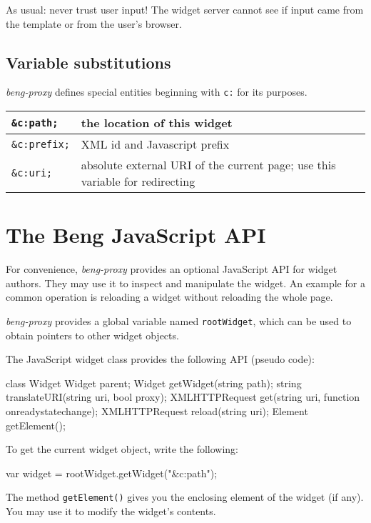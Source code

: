 \documentclass[a4paper,12pt]{article}
\begin{document}
As usual: never trust user input!  The widget server cannot see if
input came from the template or from the user's browser.

\subsection{Variable substitutions}

\emph{beng-proxy} defines special entities beginning with \texttt{c:}
for its purposes.

\begin{tabular}{|l|p{8cm}|}
\hline
\texttt{\&c:path;} & the location of this widget \\
\hline
\texttt{\&c:prefix;} & XML id and Javascript prefix \\
\hline
\texttt{\&c:uri;} & absolute external URI of the current page; use
this variable for redirecting \\
\hline
\end{tabular}


\section{The Beng JavaScript API}

For convenience, \emph{beng-proxy} provides an optional JavaScript API
for widget authors.  They may use it to inspect and manipulate the
widget.  An example for a common operation is reloading a widget
without reloading the whole page.

\emph{beng-proxy} provides a global variable named
\texttt{rootWidget}, which can be used to obtain pointers to other
widget objects.

The JavaScript widget class provides the following API (pseudo code):

\begin{verbatim*}
class Widget {
  Widget parent;
  Widget getWidget(string path);
  string translateURI(string uri, bool proxy);
  XMLHTTPRequest get(string uri, function onreadystatechange);
  XMLHTTPRequest reload(string uri);
  Element getElement();
}
\end{verbatim*}

To get the current widget object, write the following:

\begin{verbatim*}
var widget = rootWidget.getWidget("&c:path");
\end{verbatim*}

The method \texttt{getElement()} gives you the enclosing element of
the widget (if any).  You may use it to modify the widget's contents.
\end{document}
